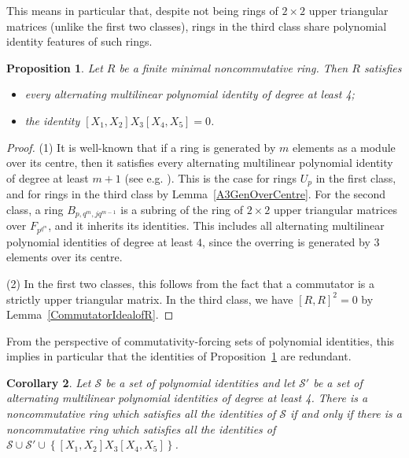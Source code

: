 \documentclass[11pt]{article}
\newtheorem{corollary}{Corollary}[section]
\newtheorem{proposition}[corollary]{Proposition}
\theoremstyle{definition}
\begin{document}
This means in particular that, despite not being rings of $2\times 2$ upper triangular matrices (unlike the first two classes), rings in the third class share polynomial identity features of such rings.

\begin{proposition}\label{CommonIdentitiesMinNonco}
Let $R$ be a finite minimal noncommutative ring. Then $R$ satisfies
\begin{itemize}[topsep=0pt]
\item[(1)] every alternating multilinear polynomial identity of degree at least 4;
\item[(2)] the identity $[X_1,X_2]X_3[X_4,X_5]=0$.
\end{itemize}
\end{proposition}

\begin{proof}
(1) It is well-known that if a ring is generated by $m$ elements as a module over its centre, then it satisfies every alternating multilinear polynomial identity of degree at least $m+1$ (see e.g. \cite[Corollary~13.1.13(i)]{McConnell-Robson}). This is the case for rings $U_p$ in the first class, and for rings in the third class by Lemma~\ref{A3GenOverCentre}. For the second class, a ring $B_{p,q^m,jq^{m-1}}$ is a subring of the ring of $2\times 2$ upper triangular matrices over $F_{p^{q^m}}$, and it inherits its identities. This includes all alternating multilinear polynomial identities of degree at least $4$, since the overring is generated by $3$ elements over its centre.

(2) In the first two classes, this follows from the fact that a commutator is a strictly upper triangular matrix. In the third class, we have $[R,R]^2=0$ by Lemma~\ref{CommutatorIdealofR}.
\end{proof}

From the perspective of commutativity-forcing sets of polynomial identities, this implies in particular that the identities of Proposition~\ref{CommonIdentitiesMinNonco} are redundant.

\begin{corollary}
Let $\mathcal{S}$ be a set of polynomial identities and let $\mathcal{S}'$ be a set of alternating multilinear polynomial identities of degree at least 4. There is a noncommutative ring which satisfies all the identities of $\mathcal{S}$ if and only if there is a noncommutative ring which satisfies all the identities of $\mathcal{S}\cup\mathcal{S}'\cup\left\lbrace[X_1,X_2]X_3[X_4,X_5]\right\rbrace$.
\end{corollary}
\end{document}
